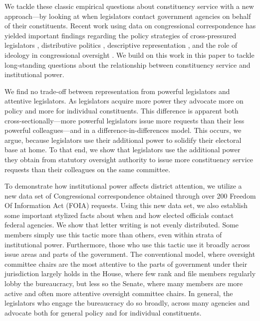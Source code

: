 \documentclass{article}
\begin{document}
We tackle these classic empirical questions about constituency service with a new approach---by looking at when legislators contact government agencies on behalf of their constituents.  Recent work using data on congressional correspondence has yielded important findings regarding the policy strategies of cross-pressured legislators \citep{Ritchie2017}, distributive politics \citep{MillsKalafHuges2015}, descriptive representation \citep{LowandeRitchieLauterbach2018}, and the role of ideology in congressional oversight \citep{Lowande2018JOP}.  We build on this work in this paper to tackle long-standing questions about the relationship between constituency service and institutional power.  

We find no trade-off between representation from powerful legislators and attentive legislators.  As legislators acquire more power they advocate more on policy and more for individual constituents.  This difference is apparent both cross-sectionally---more powerful legislators issue more requests than their less powerful colleagues---and in a difference-in-differences model.
This occurs, we argue, because legislators use their additional power to solidify their electoral base at home. To that end, we show that legislators use the additional power they obtain from statutory oversight authority to issue more constituency service requests than their colleagues on the same committee.  

To demonstrate how institutional power affects district attention, we utilize a new data set of Congressional correspondence obtained through over 200 Freedom Of Information Act (FOIA) requests. Using this new data set, we also establish some important stylized facts about when and how elected officials contact federal agencies. We show that letter writing is not evenly distributed. Some members simply use this tactic more than others, even within strata of institutional power. Furthermore, those who use this tactic use it broadly across issue areas and parts of the government. The conventional model, where oversight committee chairs are the most attentive to the parts of government under their jurisdiction largely holds in the House, where few rank and file members regularly lobby the bureaucracy, but less so the Senate, where many members are more active and often more attentive oversight committee chairs.  In general, the legislators who engage the bureaucracy do so broadly, across many agencies and advocate both for general policy and for individual constituents.   
\end{document}
